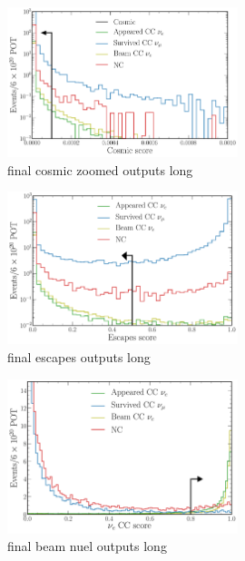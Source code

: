\begin{figure} %
    \includegraphics[width=0.6\textwidth]{diagrams/6-cvn/chipsnet/final_cosmic_zoomed_outputs.pdf}
    \caption[final cosmic zoomed outputs short]
    {final cosmic zoomed outputs long}
    \label{fig:final_cosmic_zoomed_outputs}
\end{figure}

\begin{figure} %
    \includegraphics[width=0.6\textwidth]{diagrams/6-cvn/chipsnet/final_escapes_outputs.pdf}
    \caption[final escapes outputs short]
    {final escapes outputs long}
    \label{fig:final_escapes_outputs}
\end{figure}

\begin{figure} %
    \includegraphics[width=0.6\textwidth]{diagrams/6-cvn/chipsnet/final_beam_nuel_outputs.pdf}
    \caption[final beam nuel outputs short]
    {final beam nuel outputs long}
    \label{fig:final_beam_nuel_outputs}
\end{figure}

